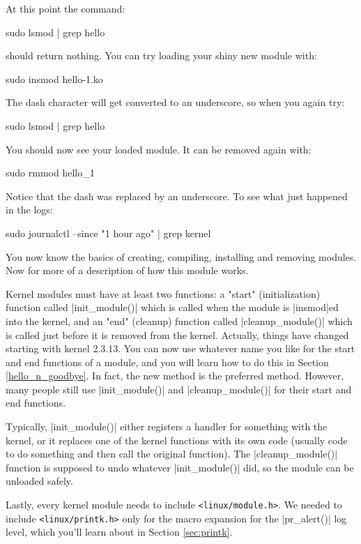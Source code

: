 \documentclass[10pt, oneside]{book}
\begin{document}
At this point the command:
\begin{codebash}
sudo lsmod | grep hello
\end{codebash}

should return nothing.
You can try loading your shiny new module with:
\begin{codebash}
sudo insmod hello-1.ko
\end{codebash}

The dash character will get converted to an underscore, so when you again try:
\begin{codebash}
sudo lsmod | grep hello
\end{codebash}

You should now see your loaded module. It can be removed again with:
\begin{codebash}
sudo rmmod hello_1
\end{codebash}

Notice that the dash was replaced by an underscore.
To see what just happened in the logs:
\begin{codebash}
sudo journalctl --since "1 hour ago" | grep kernel
\end{codebash}

You now know the basics of creating, compiling, installing and removing modules.
Now for more of a description of how this module works.

Kernel modules must have at least two functions: a "start" (initialization) function called \cpp|init_module()| which is called when the module is \sh|insmod|ed into the kernel, and an "end" (cleanup) function called \cpp|cleanup_module()| which is called just before it is removed from the kernel.
Actually, things have changed starting with kernel 2.3.13.
You can now use whatever name you like for the start and end functions of a module, and you will learn how to do this in Section \ref{hello_n_goodbye}.
In fact, the new method is the preferred method.
However, many people still use \cpp|init_module()| and \cpp|cleanup_module()| for their start and end functions.

Typically, \cpp|init_module()| either registers a handler for something with the kernel, or it replaces one of the kernel functions with its own code (usually code to do something and then call the original function).
The \cpp|cleanup_module()| function is supposed to undo whatever \cpp|init_module()| did, so the module can be unloaded safely.

Lastly, every kernel module needs to include \verb|<linux/module.h>|.
We needed to include \verb|<linux/printk.h>| only for the macro expansion for the \cpp|pr_alert()| log level, which you'll learn about in Section \ref{sec:printk}.
\end{document}

